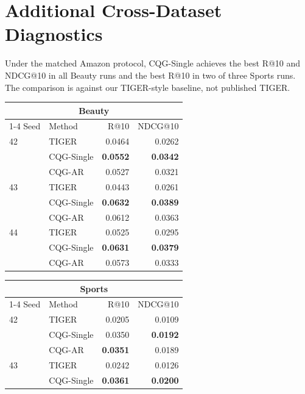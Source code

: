 \documentclass[letterpaper]{article}
\begin{document}
\clearpage
\pagestyle{plain}
\onecolumn
\appendix
\setcounter{secnumdepth}{2}


\section{Additional Cross-Dataset Diagnostics}
\label{app:auto-completed}
Under the matched Amazon protocol, CQG-Single achieves the best R@10 and
NDCG@10 in all Beauty runs and the best R@10 in two of three Sports runs.
The comparison is against our TIGER-style baseline, not published TIGER.
\begin{table}[H]
\centering
\small
\begin{minipage}[t]{0.48\textwidth}
\centering
\begin{tabular}{llrr}
\toprule
\multicolumn{4}{c}{\textbf{Beauty}} \\
\cmidrule(lr){1-4}
Seed & Method & R@10 & NDCG@10 \\
\midrule
42 & TIGER & 0.0464 & 0.0262 \\
 & CQG-Single & \textbf{0.0552} & \textbf{0.0342} \\
 & CQG-AR & 0.0527 & 0.0321 \\
43 & TIGER & 0.0443 & 0.0261 \\
 & CQG-Single & \textbf{0.0632} & \textbf{0.0389} \\
 & CQG-AR & 0.0612 & 0.0363 \\
44 & TIGER & 0.0525 & 0.0295 \\
 & CQG-Single & \textbf{0.0631} & \textbf{0.0379} \\
 & CQG-AR & 0.0573 & 0.0333 \\
\bottomrule
\end{tabular}
\end{minipage}\hfill
\begin{minipage}[t]{0.48\textwidth}
\centering
\begin{tabular}{llrr}
\toprule
\multicolumn{4}{c}{\textbf{Sports}} \\
\cmidrule(lr){1-4}
Seed & Method & R@10 & NDCG@10 \\
\midrule
42 & TIGER & 0.0205 & 0.0109 \\
 & CQG-Single & 0.0350 & \textbf{0.0192} \\
 & CQG-AR & \textbf{0.0351} & 0.0189 \\
43 & TIGER & 0.0242 & 0.0126 \\
 & CQG-Single & \textbf{0.0361} & \textbf{0.0200} \\

\end{tabular}
\end{minipage}
\end{table}
\end{document}
